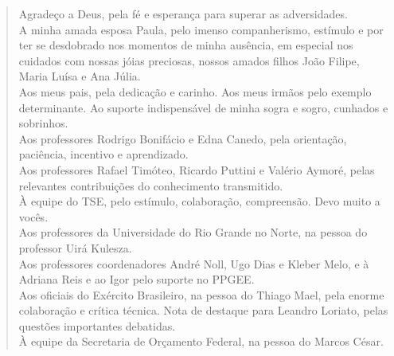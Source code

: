 


\begin{quote}

Agradeço a Deus, pela fé e esperança para superar as adversidades.\\
A minha amada esposa Paula, pelo imenso companherismo, estímulo e por ter se
desdobrado nos momentos de minha ausência, em especial nos cuidados com nossas jóias
preciosas, nossos amados filhos João Filipe, Maria Luísa e Ana Júlia.\\
Aos meus pais, pela dedicação e carinho. Aos meus irmãos pelo exemplo
determinante. Ao suporte indispensável de minha sogra e sogro, cunhados e
sobrinhos.\\
Aos professores Rodrigo Bonifácio e Edna Canedo, pela orientação,
paciência, incentivo e aprendizado.\\
Aos professores Rafael Timóteo, Ricardo Puttini e Valério Aymoré, pelas
relevantes contribuições do conhecimento transmitido.\\
À equipe do TSE, pelo estímulo, colaboração, compreensão. Devo muito a vocês.\\
Aos professores da Universidade do Rio Grande no Norte, na pessoa do professor
Uirá Kulesza.\\
Aos professores coordenadores André Noll, Ugo Dias e Kleber Melo, e à
Adriana Reis e ao Igor pelo suporte no PPGEE.\\
Aos oficiais do Exército Brasileiro, na pessoa do Thiago Mael, pela enorme
colaboração e crítica técnica. Nota de destaque para Leandro Loriato, pelas
questões importantes debatidas.\\
À equipe da Secretaria de Orçamento Federal, na pessoa do Marcos
César.\\



 
\end{quote}

\clearpage

\pagebreak


